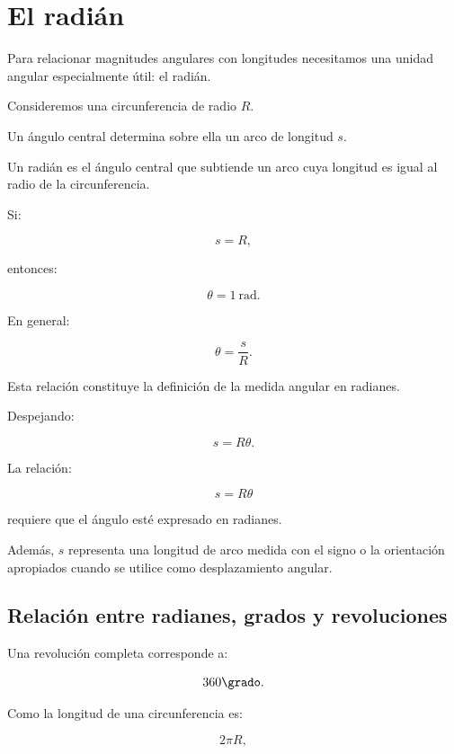 \section{El radián}

Para relacionar magnitudes angulares con longitudes necesitamos una unidad
angular especialmente útil: el radián.

Consideremos una circunferencia de radio \(R\).

Un ángulo central determina sobre ella un arco de longitud \(s\).

\begin{definicion}[Radián]

Un radián es el ángulo central que subtiende un arco cuya longitud es igual al
radio de la circunferencia.

\end{definicion}

Si:

\[
s=R,
\]

entonces:

\[
\theta=\SI{1}{\radian}.
\]

En general:

\[
\boxed{\theta=\frac{s}{R}}.
\]

Esta relación constituye la definición de la medida angular en radianes.

Despejando:

\[
\boxed{s=R\theta}.
\]

\begin{condicion}

La relación:

\[
s=R\theta
\]

requiere que el ángulo esté expresado en radianes.

Además, \(s\) representa una longitud de arco medida con el signo o la
orientación apropiados cuando se utilice como desplazamiento angular.

\end{condicion}


\subsection{Relación entre radianes, grados y revoluciones}

Una revolución completa corresponde a:

\[
360\grado.
\]

Como la longitud de una circunferencia es:

\[
2\pi R,
\]

